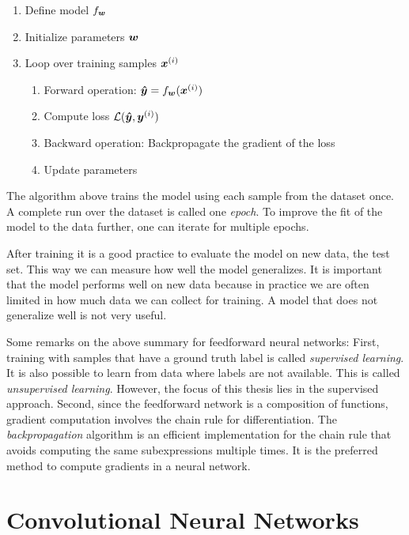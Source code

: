 		\begin{enumerate}
			\item Define model $f_{\bm{w}}$
			\item Initialize parameters $\bm{w}$
			\item Loop over training samples $\bm{x}^{(i)}$ %
			\begin{enumerate}
				\item Forward operation: $\bm{\hat{y}} = f_{\bm{w}}(\bm{x}^{(i)})$
				\item Compute loss $\mathcal{L}(\bm{\hat{y}}, \bm{y}^{(i)})$
				\item Backward operation: Backpropagate the gradient of the loss 
				\item Update parameters
			\end{enumerate}
		\end{enumerate}
		The algorithm above trains the model using each sample from the dataset once.
		A complete run over the dataset is called one \emph{epoch}.
		To improve the fit of the model to the data further, one can iterate for multiple epochs.
		
		After training it is a good practice to evaluate the model on new data, the test set.
		This way we can measure how well the model generalizes.
		It is important that the model performs well on new data because in practice we are often limited in how much data we can collect for training.
		A model that does not generalize well is not very useful.
		
		Some remarks on the above summary for feedforward neural networks:
		First, training with samples that have a ground truth label is called \emph{supervised learning}.
		It is also possible to learn from data where labels are not available.
		This is called \emph{unsupervised learning}.
		However, the focus of this thesis lies in the supervised approach.
		Second, since the feedforward network is a composition of functions, gradient computation involves the chain rule for differentiation.
		The \emph{backpropagation} algorithm is an efficient implementation for the chain rule that avoids computing the same subexpressions multiple times.
		It is the preferred method to compute gradients in a neural network.
		
	\section{Convolutional Neural Networks}
	
